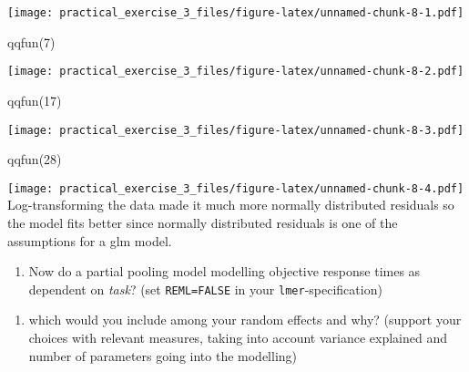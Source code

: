 \documentclass[
]{article}
\newenvironment{Shaded}{\begin{snugshade}}{\end{snugshade}}
\newcommand{\DecValTok}[1]{\textcolor[rgb]{0.00,0.00,0.81}{#1}}
\newcommand{\FunctionTok}[1]{\textcolor[rgb]{0.00,0.00,0.00}{#1}}
\newcommand{\NormalTok}[1]{#1}
\providecommand{\tightlist}{%
  \setlength{\itemsep}{0pt}\setlength{\parskip}{0pt}}
\begin{document}
\texttt{[image: practical\_exercise\_3\_files/figure-latex/unnamed-chunk-8-1.pdf]}

\begin{Shaded}
\begin{Highlighting}[]
\FunctionTok{qqfun}\NormalTok{(}\DecValTok{7}\NormalTok{)}
\end{Highlighting}
\end{Shaded}

\texttt{[image: practical\_exercise\_3\_files/figure-latex/unnamed-chunk-8-2.pdf]}

\begin{Shaded}
\begin{Highlighting}[]
\FunctionTok{qqfun}\NormalTok{(}\DecValTok{17}\NormalTok{)}
\end{Highlighting}
\end{Shaded}

\texttt{[image: practical\_exercise\_3\_files/figure-latex/unnamed-chunk-8-3.pdf]}

\begin{Shaded}
\begin{Highlighting}[]
\FunctionTok{qqfun}\NormalTok{(}\DecValTok{28}\NormalTok{)}
\end{Highlighting}
\end{Shaded}

\texttt{[image: practical\_exercise\_3\_files/figure-latex/unnamed-chunk-8-4.pdf]}
Log-transforming the data made it much more normally distributed
residuals so the model fits better since normally distributed residuals
is one of the assumptions for a glm model.

\begin{enumerate}
\def\labelenumi{\arabic{enumi})}
\setcounter{enumi}{1}
\tightlist
\item
  Now do a partial pooling model modelling objective response times as
  dependent on \emph{task}? (set \texttt{REML=FALSE} in your
  \texttt{lmer}-specification)\\
\end{enumerate}

\begin{enumerate}
\def\labelenumi{\roman{enumi}.}
\tightlist
\item
  which would you include among your random effects and why? (support
  your choices with relevant measures, taking into account variance
  explained and number of parameters going into the modelling)
\end{enumerate}
\end{document}
